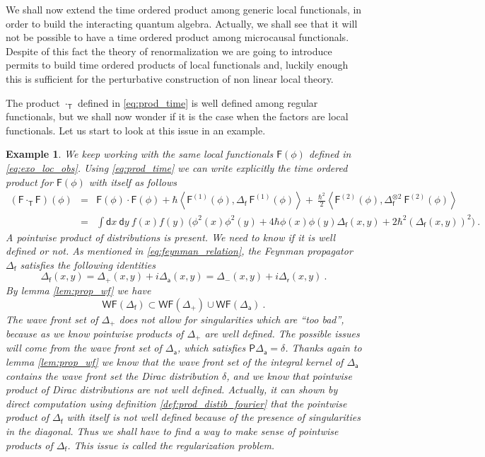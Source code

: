 \documentclass[11pt]{book}
\newcommand{\WF}{\mathsf{WF}}
\newcommand{\sm}[1]{\left\langle#1\right\rangle}
\newcommand{\Fsf}{\mathsf{F}}
\newcommand{\Psf}{\mathsf{P}}
\newcommand{\Tsf}{\mathsf{T}}
\newcommand{\asf}{\mathsf{a}}
\newcommand{\dsf}{\mathsf{d}}
\newcommand{\fsf}{\mathsf{f}}
\newcommand{\rsf}{\mathsf{r}}
\theoremstyle{break}
\newtheorem{example}{Example}[chapter]
\begin{document}
We shall now extend the time ordered product among generic local functionals, in order to build the interacting quantum algebra. Actually, we shall see that it will not be possible to have a time ordered product among microcausal functionals. Despite of this fact the theory of renormalization we are going to introduce permits to build time ordered products of local functionals and, luckily enough this is sufficient for the perturbative construction of non linear local theory.


The product $\cdot_\Tsf$ defined in \eqref{eq:prod_time} is well defined among regular functionals, but we shall now wonder if it is the case when the factors are local functionals. Let us start to look at this issue in an example.


\begin{example}\label{exo:t_prod_loc_obs}
We keep working with the same local functionals $\Fsf(\phi)$ defined in \eqref{eq:exo_loc_obs}. Using \eqref{eq:prod_time} we can write explicitly the time ordered product for $\Fsf(\phi)$ with itself as follows
%
\begin{eqnarray*}
(\Fsf \cdot_\Tsf \Fsf)(\phi) &=& \Fsf(\phi) \cdot \Fsf(\phi) + \hbar \sm{ \Fsf^{(1)}(\phi) , \Delta_\fsf \ \Fsf^{(1)}(\phi) } + \ \frac{\hbar^2}{2} \sm{ \Fsf^{(2)}(\phi) , \Delta_\fsf^{\otimes 2} \ \Fsf^{(2)}(\phi)} \\
%
&=& \int \dsf x \ \dsf y \ f(x) f(y) \ \bigg( \phi^2(x) \phi^2(y) + 4 \hbar \phi(x) \phi(y) \Delta_\fsf(x,y) + 2 \hbar^2 \left(\Delta_\fsf(x,y)\right)^2 \bigg) \ .
\end{eqnarray*}
%
A pointwise product of distributions is present. We need to know if it is well defined or not. As mentioned in \eqref{eq:feynman_relation}, the Feynman propagator $\Delta_\fsf$ satisfies the following identities
%
\begin{equation}
\Delta_\fsf(x,y) = \Delta_+(x,y) + i \Delta_\asf(x,y) = \Delta_-(x,y) + i \Delta_\rsf(x,y) \ .
\label{eq:conv_feynman_prop}
\end{equation}
%
By lemma \ref{lem:prop_wf} we have
%
\begin{equation*}
\WF(\Delta_\fsf) \subset \WF(\Delta_+) \cup \WF(\Delta_\asf) \ .
\end{equation*}
%
The wave front set of $\Delta_+$ does not allow for  singularities which are ``too bad'', because as we know pointwise products of $\Delta_+$ are well defined. The possible issues will come from the wave front set of $\Delta_\asf$, which satisfies $\Psf \Delta_\asf = \delta$. Thanks again to lemma \ref{lem:prop_wf} we know that the wave front set of the integral kernel of $\Delta_\asf$ contains the wave front set the Dirac distribution $\delta$, and we know that pointwise product of Dirac distributions are not well defined. 
Actually, it can shown by direct computation using definition \ref{def:prod_distib_fourier} that the pointwise product of $\Delta_\fsf$ with itself is not well defined because of the presence of singularities in the diagonal. Thus we shall have to find a way to make sense of pointwise products of $\Delta_\fsf$. This issue is called the regularization problem.
\end{example}
\end{document}

